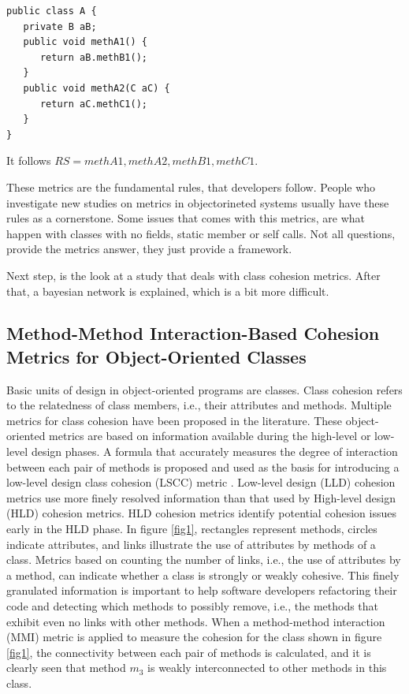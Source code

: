 \begin{small}
\begin{verbatim}
public class A {
   private B aB;
   public void methA1() {
      return aB.methB1();
   }
   public void methA2(C aC) {
      return aC.methC1();
   }
}
\end{verbatim}
\end{small}

It follows $RS = { methA1, methA2, methB1, methC1}$.

These metrics are the fundamental rules, that developers follow. People who investigate new studies on metrics in objectorineted systems usually have these rules as a cornerstone.
Some issues that comes with this metrics, are what happen with classes with no fields, static member or self calls. Not all questions, provide the metrics answer, they just provide a framework.

Next step, is the look at a study that deals with class cohesion metrics. After that, a bayesian network is explained, which is a bit more difficult.


\subsection{Method-Method Interaction-Based Cohesion Metrics for Object-Oriented Classes}\label{mmi}

Basic units of design in object-oriented programs are classes. Class cohesion refers to the relatedness of class members, i.e., their attributes and methods. Multiple metrics for class cohesion have been proposed in the literature. These object-oriented metrics are based on information available during the high-level or low-level design phases.
A formula that accurately measures the degree of interaction between each pair of methods is proposed and used as the basis for introducing a low-level design class cohesion (LSCC) metric \cite{b8al2012precise}. Low-level design (LLD) cohesion metrics use more finely resolved information than that used by High-level design (HLD) cohesion metrics. HLD cohesion metrics identify potential cohesion issues early in the HLD phase. 
In figure \ref{fig1}, rectangles represent methods, circles indicate attributes, and links illustrate the use of attributes by methods of a class. Metrics based on counting the number of links, i.e., the use of attributes by a method, can indicate whether a class is strongly or weakly cohesive. This finely granulated information is important to help software developers refactoring their code and detecting which methods to possibly remove, i.e., the methods that exhibit even no links with other methods. When a method-method interaction (MMI) metric is applied to measure the cohesion for the class shown in figure \ref{fig1}, the connectivity between each pair of methods is calculated, and it is clearly seen that method $m_3$ is weakly interconnected to other methods in this class.

